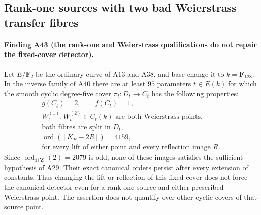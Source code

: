 \subsection{Rank-one sources with two bad Weierstrass transfer fibres}

\paragraph{Finding A43 (the rank-one and Weierstrass qualifications do not repair the fixed-cover detector).}
Let $E/\mathbf F_2$ be the ordinary curve of A13 and A38, and
base change it to $k=\mathbf F_{128}$. In the inverse family
of A40 there are at least $95$ parameters $t\in E(k)$ for
which the smooth cyclic degree-five cover
$\pi_t:D_t\to C_t$ has the following properties:
\[
 \begin{gathered}
       g(C_t)=2,\qquad f(C_t)=1,\\
 W_t^{(1)},W_t^{(2)}\in C_t(k)\text{ are both Weierstrass points,}\\
 \text{both fibres are split in }D_t,\\
 \operatorname{ord}([K_E-2R])=4159,\\
 \text{for every lift of either point and every reflection image }R.
 \end{gathered}
 \tag{RWI.1}
\]
Since $\operatorname{ord}_{4159}(2)=2079$ is odd, none of
these images satisfies the sufficient hypothesis of A29.
Their exact canonical orders persist after every extension
of constants. Thus changing the lift or reflection of this
fixed cover does not force the canonical detector even for
a rank-one source and either prescribed Weierstrass point.
The assertion does not quantify over other cyclic covers
of that source point.


